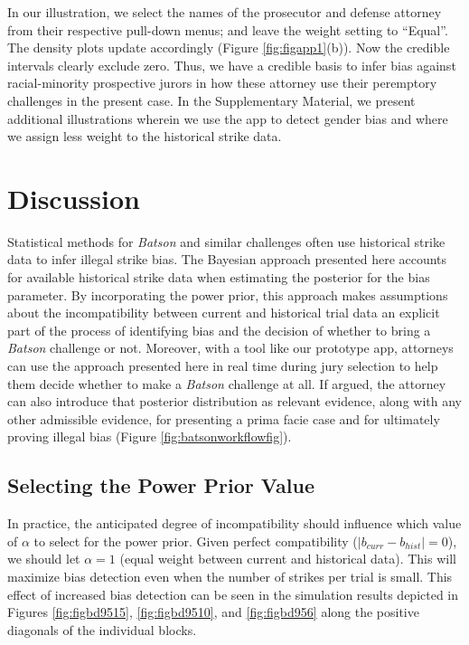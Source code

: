 \documentclass[12pt]{article}
\begin{document}
In our illustration, we select the names of the prosecutor and defense attorney from their respective pull-down menus; and leave the weight setting to ``Equal''. The density plots update accordingly (Figure \ref{fig:figapp1}(b)). Now the credible intervals clearly exclude zero. Thus, we have a credible basis to infer bias against racial-minority prospective jurors in how these attorney use their peremptory challenges in the present case. In the Supplementary Material, we present additional illustrations wherein we use the app to detect gender bias and where we assign less weight to the historical strike data.

\hypertarget{discussion}{%
\section{Discussion}\label{discussion}}

Statistical methods for \emph{Batson} and similar challenges often use historical strike data to infer illegal strike bias. The Bayesian approach presented here accounts for available historical strike data when estimating the posterior for the bias parameter. By incorporating the power prior, this approach makes assumptions about the incompatibility between current and historical trial data an explicit part of the process of identifying bias and the decision of whether to bring a \emph{Batson} challenge or not. Moreover, with a tool like our prototype app, attorneys can use the approach presented here in real time during jury selection to help them decide whether to make a \emph{Batson} challenge at all. If argued, the attorney can also introduce that posterior distribution as relevant evidence, along with any other admissible evidence, for presenting a prima facie case and for ultimately proving illegal bias (Figure \ref{fig:batsonworkflowfig}).

\hypertarget{selectingalpha}{%
\subsection{Selecting the Power Prior Value}\label{selectingalpha}}

In practice, the anticipated degree of incompatibility should influence which value of \(\alpha\) to select for the power prior. Given perfect compatibility (\(\lvert b_{curr} - b_{hist} \rvert = 0\)), we should let \(\alpha = 1\) (equal weight between current and historical data). This will maximize bias detection even when the number of strikes per trial is small. This effect of increased bias detection can be seen in the simulation results depicted in Figures \ref{fig:figbd9515}, \ref{fig:figbd9510}, and \ref{fig:figbd956} along the positive diagonals of the individual blocks.
\end{document}
